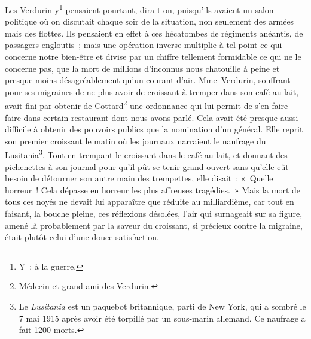 
{

Les Verdurin y\footnote{Y~: à la guerre.} pensaient pourtant,
dira-t-on, puisqu'ils avaient un salon politique où on discutait
chaque soir de la situation, non seulement des armées mais des
flottes. Ils pensaient en effet à ces hécatombes de régiments
anéantis, de passagers engloutis~; mais une opération inverse
multiplie à tel point ce qui concerne notre bien-être et divise par
un chiffre tellement formidable ce qui ne le concerne pas, que la
mort de millions d'inconnus nous chatouille à peine et presque moins
désagréablement qu'un courant d'air. Mme~Verdurin, souffrant pour ses
migraines de ne plus avoir de croissant à tremper dans son café au
lait, avait fini par obtenir de Cottard\footnote{Médecin et grand ami
des Verdurin.} une ordonnance qui lui permit de s'en faire faire dans
certain restaurant dont nous avons parlé. Cela avait été presque
aussi difficile à obtenir des pouvoirs publics que la nomination d'un
général. Elle reprit son premier croissant le matin où les journaux
narraient le naufrage du Lusitania\footnote{Le \textit{Lusitania} est
un paquebot britannique, parti de New York, qui a sombré le 7 mai
1915 après avoir été torpillé par un sous-marin allemand. Ce naufrage
a fait 1200 morts.}. Tout en trempant le croissant dans le café au
lait, et donnant des pichenettes à son journal pour qu'il pût se
tenir grand ouvert sans qu'elle eût besoin de détourner son autre
main des trempettes, elle disait~: «~Quelle horreur~! Cela dépasse en
horreur les plus affreuses tragédies.~» Mais la mort de tous ces
noyés ne devait lui apparaître que réduite au milliardième, car tout
en faisant, la bouche pleine, ces réflexions désolées, l'air qui
surnageait sur sa figure, amené là probablement par la saveur du
croissant, si précieux contre la migraine, était plutôt celui d'une
douce satisfaction.
}


